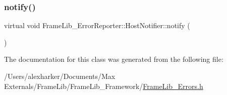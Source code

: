 \subsubsection{\texorpdfstring{notify()}{notify()}}
{\footnotesize\ttfamily virtual void Frame\+Lib\+\_\+\+Error\+Reporter\+::\+Host\+Notifier\+::notify (\begin{DoxyParamCaption}{ }\end{DoxyParamCaption})\hspace{0.3cm}{\ttfamily [pure virtual]}}



The documentation for this class was generated from the following file\+:\begin{DoxyCompactItemize}
\item 
/\+Users/alexharker/\+Documents/\+Max Externals/\+Frame\+Lib/\+Frame\+Lib\+\_\+\+Framework/\hyperlink{_frame_lib___errors_8h}{Frame\+Lib\+\_\+\+Errors.\+h}\end{DoxyCompactItemize}
